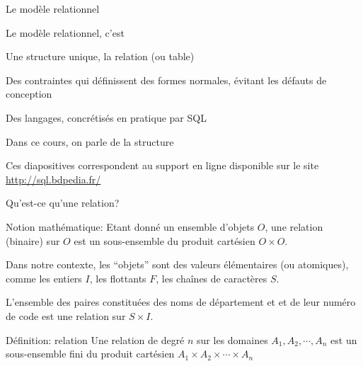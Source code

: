 
\begin{frame}[fragile]{Le modèle relationnel}

Le modèle relationnel, c'est

\begin{redbullet}
  \item Une structure unique, la relation (ou table)
  \item Des contraintes qui définissent des \alert{formes normales}, évitant les défauts de conception
  \item Des langages, concrétisés en pratique par SQL
\end{redbullet}

\vfill

Dans ce cours, on parle de la structure

\vfill
\begin{blocgauche}
\alert{Ces diapositives correspondent au support en ligne disponible sur
le site \url{http://sql.bdpedia.fr/}}
\end{blocgauche}

\end{frame}


\begin{frame}{Qu'est-ce qu'une relation?}

\alert{Notion mathématique}: 
Etant donné un ensemble d'objets $O$, une \alert{relation} (binaire)
sur $O$  est un sous-ensemble du produit cartésien $O \times O$.

\vfill
 Dans notre contexte, les ``objets''  sont des \alert{valeurs élémentaires} (ou \alert{atomiques}), comme 
 les entiers $I$, les flottants $F$, les chaînes de caractères $S$.


\vfill
\begin{blocgauche}
L'ensemble des paires constituées des noms de département et 
et de leur numéro de code  est une relation sur $S \times I$. 

\begin{defblock}{Définition: relation}
Une relation de degré $n$ sur les domaines $A_1, A_2, \cdots, A_n$
    est un sous-ensemble fini du produit cartésien  $A_1 \times A_2 \times  \cdots \times A_n$
\end{defblock}
\end{blocgauche}
\end{frame}


